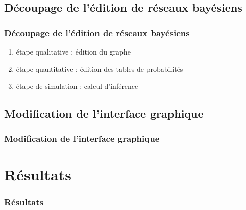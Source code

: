 \documentclass{beamer}
\begin{document}
	\subsection{Découpage de l'édition de réseaux bayésiens}
	
\begin{frame}
	\frametitle{Découpage de l'édition de réseaux bayésiens}
	
	\begin{enumerate}
	\item étape qualitative : édition du graphe 
	\item étape quantitative : édition des tables de probabilités
	\item étape de simulation : calcul d'inférence
	\end{enumerate}	
	
\end{frame}

	
	\subsection{Modification de l'interface graphique}
	
\begin{frame}
	\frametitle{Modification de l'interface graphique}
\end{frame}


\section{Résultats}


\begin{frame}
\frametitle{Résultats}
\end{frame}


\end{document}

